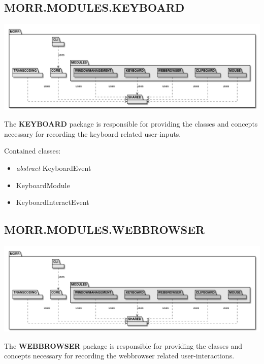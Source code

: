 \subsection*{MORR.MODULES.KEYBOARD}

\begin{center}
    \includegraphics[width=1.0\textwidth]{resources/Packages/AllPackages.png}
\end{center}

The \textbf{KEYBOARD} package is responsible for providing the classes and concepts necessary for recording the keyboard related user-inputs.

Contained classes:
\begin{itemize}
\item \textit{abstract} KeyboardEvent
\item KeyboardModule
\item KeyboardInteractEvent
\end{itemize}

\newpage
\subsection*{MORR.MODULES.WEBBROWSER}

\begin{center}
    \includegraphics[width=1.0\textwidth]{resources/Packages/AllPackages.png}
\end{center}

The \textbf{WEBBROWSER} package is responsible for providing the classes and concepts necessary for recording the webbrowser related user-interactions.

